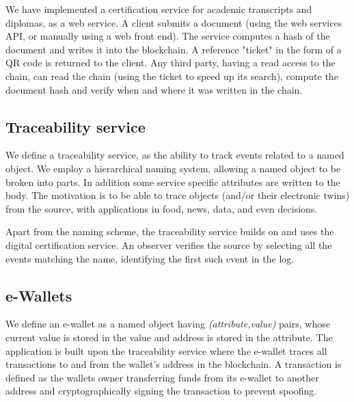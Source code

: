 \documentclass[10pt]{article}
\begin{document}
We have implemented a certification service for academic transcripts and diplomas, as a web service. A client submits a document (using the web services API, or manually using a web front end). The service computes a hash of the document and writes it into the blockchain. A reference "ticket" in the form of a QR code is returned to the client. Any third party, having a read access to the chain, can read the chain (using the ticket to speed up its search), compute the document hash and verify when and where it was written in the chain.


\subsection{Traceability service}
We define a traceability service, as the ability to track events related to a named object. We employ a hierarchical naming system, allowing a named object to be broken into parts. In addition some service specific attributes are written to the body. The motivation is to be able to trace objects (and/or their electronic twins) from the source, with applications in food, news, data, and even decisions.

Apart from the naming scheme, the traceability service builds on and uses the digital certification service. An observer verifies the source by selecting all the events matching the name, identifying the first such event in the log.

\subsection{e-Wallets}

We define an e-wallet as a named object having \emph{(attribute,value)} pairs, whose current value is stored in the value and address is stored in the attribute. The application is built upon the traceability service where the e-wallet traces all transactions to and from the wallet's address in the blockchain. A transaction is defined as the wallets owner transferring funds from its e-wallet to another address and cryptographically signing the transaction to prevent spoofing. 
\end{document}

